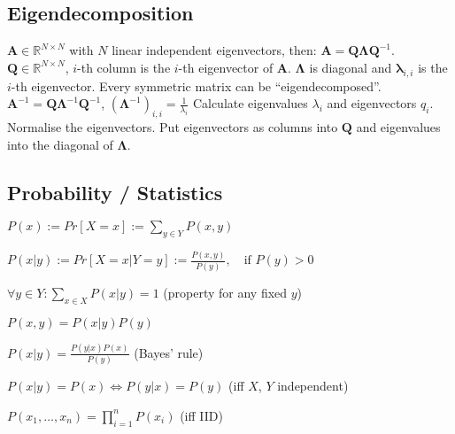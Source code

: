 \documentclass[a4paper, 11pt, landscape]{article}
\begin{document}
\begin{multicols*}{3}
\subsection{Eigendecomposition}
$\mathbf{A} \in \mathbb{R}^{N \times N}$ with $N$ linear independent eigenvectors, then: $\mathbf{A} = \mathbf{Q} \boldsymbol{\Lambda} \mathbf{Q}^{-1}$. $\mathbf{Q} \in \mathbb{R}^{N \times N}$, $i$-th column is the $i$-th eigenvector of $\mathbf{A}$. $\boldsymbol{\Lambda}$ is diagonal and $\boldsymbol{\lambda}_{i,i}$ is the $i$-th eigenvector. Every symmetric matrix can be ``eigendecomposed''. 
$\mathbf{A}^{-1} = \mathbf{Q} \boldsymbol{\Lambda}^{-1} \mathbf{Q}^{-1}$, $(\boldsymbol{\Lambda}^{-1})_{i,i} = \frac{1}{\lambda_i}$
Calculate eigenvalues $\lambda_i$ and eigenvectors $q_i$. Normalise the eigenvectors. Put eigenvectors as columns into $\mathbf{Q}$ and eigenvalues into the diagonal of $\boldsymbol{\Lambda}$.

\subsection{Probability / Statistics}
\begin{compactitem}
	\item $P(x) := Pr[X = x] := \sum_{y \in Y} P(x, y)$
	\item $P(x|y) := Pr[X = x | Y = y] := \frac{P(x,y)}{P(y)},\quad \text{if } P(y) > 0$
	\item $\forall y \in Y: \sum_{x \in X} P(x|y) = 1$ (property for any fixed $y$)
	\item $P(x, y) = P(x|y) P(y)$
	\item $P(x|y) = \frac{P(y|x)P(x)}{P(y)}$ (Bayes' rule)
	\item $P(x|y) = P(x) \Leftrightarrow P(y|x) = P(y)$ (iff $X$, $Y$ independent)
	\item $P(x_1, \ldots, x_n) = \prod_{i=1}^n P(x_i)$ (iff IID)
\end{compactitem}



\end{multicols*}
\end{document}
